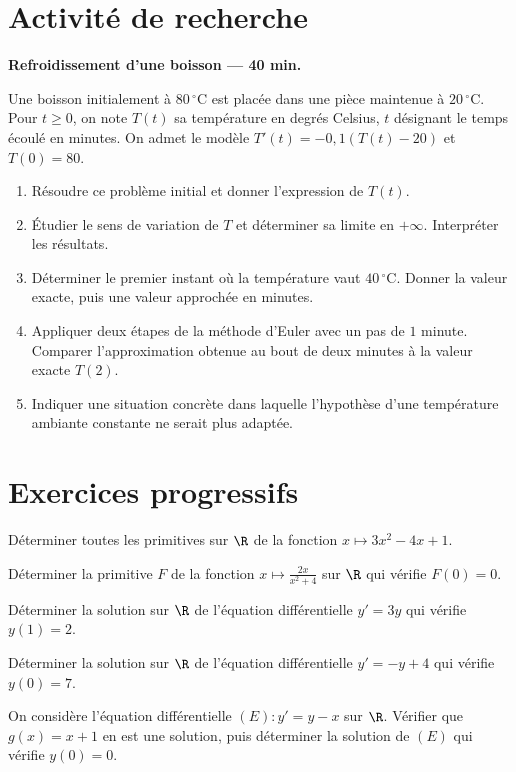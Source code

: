 \section{Activité de recherche}\textbf{Refroidissement d'une boisson --- 40 min.}\par Une boisson initialement à $80\,^{\circ}\mathrm C$ est placée dans une pièce maintenue à $20\,^{\circ}\mathrm C$. Pour $t\ge0$, on note $T(t)$ sa température en degrés Celsius, $t$ désignant le temps écoulé en minutes. On admet le modèle $T' (t)=-0{,}1(T(t)-20)$ et $T(0)=80$.
\begin{enumerate}\item Résoudre ce problème initial et donner l'expression de $T(t)$.
\item Étudier le sens de variation de $T$ et déterminer sa limite en $+\infty$. Interpréter les résultats.
\item Déterminer le premier instant où la température vaut $40\,^{\circ}\mathrm C$. Donner la valeur exacte, puis une valeur approchée en minutes.
\item Appliquer deux étapes de la méthode d'Euler avec un pas de $1$ minute. Comparer l'approximation obtenue au bout de deux minutes à la valeur exacte $T(2)$.
\item Indiquer une situation concrète dans laquelle l'hypothèse d'une température ambiante constante ne serait plus adaptée.\end{enumerate}

\section{Exercices progressifs}

Déterminer toutes les primitives sur $\R$ de la fonction $x\mapsto3x^2-4x+1$.

Déterminer la primitive $F$ de la fonction $x\mapsto\frac{2x}{x^2+4}$ sur $\R$ qui vérifie $F(0)=0$.

Déterminer la solution sur $\R$ de l'équation différentielle $y' =3y$ qui vérifie $y(1)=2$.

Déterminer la solution sur $\R$ de l'équation différentielle $y' =-y+4$ qui vérifie $y(0)=7$.

On considère l'équation différentielle $(E):y' =y-x$ sur $\R$. Vérifier que $g(x)=x+1$ en est une solution, puis déterminer la solution de $(E)$ qui vérifie $y(0)=0$.

